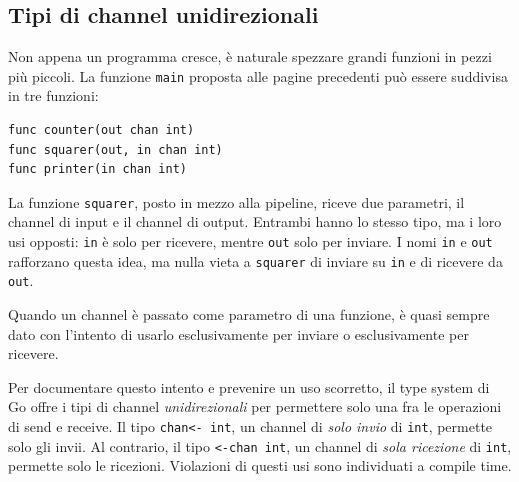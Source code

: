 \subsection{Tipi di channel unidirezionali}
\label{subsec:tipi_di_channel_unidirezionali}%
Non appena un programma cresce, è naturale spezzare grandi funzioni in pezzi più piccoli.
La funzione \verb|main| proposta alle pagine precedenti può essere suddivisa in tre funzioni:
\begin{lstlisting}[frame=single, label={lst:lstlisting7-4-3.1}]
func counter(out chan int)
func squarer(out, in chan int)
func printer(in chan int)
\end{lstlisting}
La funzione \verb|squarer|, posto in mezzo alla pipeline, riceve due parametri, il channel di input e il channel di output.
Entrambi hanno lo stesso tipo, ma i loro usi opposti: \verb|in| è solo per ricevere, mentre \verb|out| solo per inviare.
I nomi \verb|in| e \verb|out| rafforzano questa idea, ma nulla vieta a \verb|squarer| di inviare su \verb|in| e di ricevere da \verb|out|.

Quando un channel è passato come parametro di una funzione, è quasi sempre dato con l'intento di usarlo esclusivamente per inviare o esclusivamente per ricevere.

Per documentare questo intento e prevenire un uso scorretto, il type system di Go offre i tipi di channel \textit{unidirezionali} per permettere solo una fra le operazioni di send e receive.
Il tipo \verb|chan<- int|, un channel di \textit{solo invio} di \verb|int|, permette solo gli invii.
Al contrario, il tipo \verb|<-chan int|, un channel di \textit{sola ricezione} di \verb|int|, permette solo le ricezioni.
Violazioni di questi usi sono individuati a compile time.

